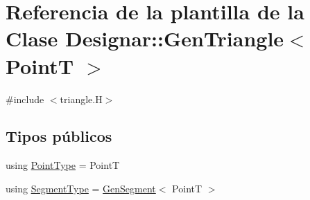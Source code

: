 \hypertarget{class_designar_1_1_gen_triangle}{}\section{Referencia de la plantilla de la Clase Designar\+:\+:Gen\+Triangle$<$ PointT $>$}
\label{class_designar_1_1_gen_triangle}


{\ttfamily \#include $<$triangle.\+H$>$}

\subsection*{Tipos públicos}
\begin{DoxyCompactItemize}
\item 
using \hyperlink{class_designar_1_1_gen_triangle_ac6e39b72d793f44a6e12b4f0ede6d472}{Point\+Type} = PointT
\item 
using \hyperlink{class_designar_1_1_gen_triangle_a97d5ba127bcf8f120b1d408215956cee}{Segment\+Type} = \hyperlink{class_designar_1_1_gen_segment}{Gen\+Segment}$<$ PointT $>$
\end{DoxyCompactItemize}
